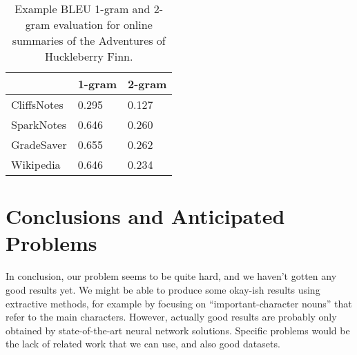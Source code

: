 \begin{table}[H]
	\centering
	\caption{Example BLEU 1-gram and 2-gram evaluation for online summaries of the Adventures of Huckleberry Finn.}\label{table:bleu_huckfinn}
	\begin{tabular}{l l l }
		\toprule
		\textbf{}   & \textbf{1-gram} & \textbf{2-gram} \\ \midrule
		CliffsNotes & 0.295           & 0.127           \\ \midrule
		SparkNotes  & 0.646           & 0.260           \\ \midrule
		GradeSaver  & 0.655           & 0.262           \\ \midrule
		Wikipedia   & 0.646           & 0.234           \\
		\bottomrule
	\end{tabular}
\end{table}


\section{Conclusions and Anticipated Problems}
In conclusion, our problem seems to be quite hard, and we haven't gotten any
good results yet. We might be able to produce some okay-ish results using
extractive methods, for example by focusing on ``important-character nouns''
that refer to the main characters. However, actually good results are probably
only obtained by state-of-the-art neural network solutions. Specific problems
would be the lack of related work that we can use, and also good datasets.

